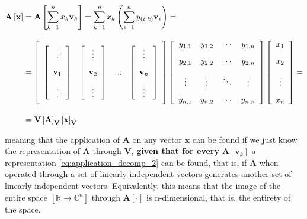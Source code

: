 \begin{align} \mathbf{A}\left[\mathbf{x}\right] &= \mathbf{A}\left[\sum\limits_{k=1}^n x_k\mathbf{v}_k\right] = \sum\limits_{k=1}^n x_k \left(\sum\limits_{i=1}^n y_{\left(i,k\right)} \mathbf{v}_i\right) = \nonumber\\[3mm]
%
	&= \left[\raisebox{15mm}{} \begin{array}{cccc} \left[\begin{array}{c} \vdots \\[3mm] \mathbf{v}_1 \\[3mm] \vdots \end{array}\right] & \left[\begin{array}{c} \vdots \\[3mm] \mathbf{v}_2 \\[3mm] \vdots \end{array}\right] & ... & \left[\begin{array}{c} \vdots \\[3mm] \mathbf{v}_n \\[3mm] \vdots \end{array}\right]\end{array}\right]\left[\begin{array}{cccc} y_{1,1} & y_{1,2} & \cdots & y_{1,n} \\[3mm] y_{2,1} & y_{2,2} & \cdots & y_{2,n} \\[3mm] \vdots & \vdots & \ddots & \vdots \\[3mm] y_{n,1} & y_{n,2} & \cdots & y_{n,n}\end{array}\right]\left[\begin{array}{c} x_1 \\[3mm] x_2 \\[3mm] \vdots \\[3mm] x_n\end{array}\right] = \nonumber \\[3mm]
%
	&= \mathbf{V} \left[\mathbf{A}\right]_\mathbf{V}\left[\mathbf{x}\right]_\mathbf{V}
\end{align}

	\noindent meaning that the application of $\mathbf{A}$ on any vector $\mathbf{x}$ can be found if we just know the representation of $\mathbf{A}$ through $\mathbf{V}$, \textbf{given that for every} $\mathbf{A}\left[\mathbf{v}_k\right]$ a representation \eqref{eq:application_decomp_2} can be found, that is, if $\mathbf{A}$ when operated through a set of linearly independent vectors generates another set of linearly independent vectors. Equivalently, this means that the image of the entire space $\left[\mathbb{R}\to\mathbb{C}^n\right]$ through $\mathbf{A}\left[\cdot\right]$ is n-dimensional, that is, the entirety of the space.

